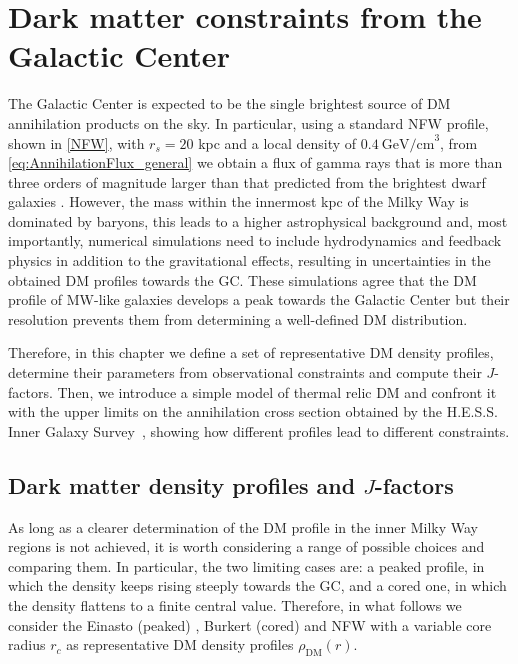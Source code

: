 \chapter{Dark matter constraints from the Galactic Center}

The Galactic Center is expected to be the single brightest source of DM annihilation products on the sky. In particular, using a standard NFW profile, shown in \cref{NFW}, with $r_s = 20$
kpc and a local density of $0.4~\text{GeV/cm}^3$, from \cref{eq:AnnihilationFlux_general} we obtain a flux of gamma rays that is more than three orders of magnitude larger than that predicted
from the brightest dwarf galaxies \cite{hooper2018tasi}.
However, the mass within the innermost kpc of the Milky Way is dominated by baryons, 
this leads to a higher astrophysical background and, most importantly, numerical simulations need to include hydrodynamics
and feedback physics in addition to the gravitational effects, resulting in uncertainties in the obtained DM profiles towards the GC.
These simulations agree that the DM profile of MW-like galaxies develops a peak towards the Galactic Center but their resolution prevents them from determining a well-defined DM distribution.

Therefore, in this chapter we define a set of representative DM density profiles, determine their parameters from observational constraints and compute their $J$-factors.
Then, we introduce a simple model of thermal relic DM and confront it with the upper limits on the annihilation cross section obtained by the H.E.S.S. Inner Galaxy Survey~\cite{Abdalla_2022},
showing how different profiles lead to different constraints.


\section{Dark matter density profiles and $J$-factors} \label{GC}

As long as a clearer determination of the DM profile in the inner Milky Way regions is not achieved, it is worth considering a range of possible choices and comparing them. 
In particular, the two limiting cases are: a peaked profile, in which the density keeps rising steeply towards the GC, and a cored one, in which the density flattens to a finite central value. 
Therefore, in what follows we consider the Einasto (peaked) \cite{Einasto1965}, Burkert (cored) \cite{Burkert1995} 
and NFW \cite{NFW1996,NFW1997} with a variable core radius $r_c$ as representative DM density profiles 
$\rho_\mathrm{DM}(r)$.


